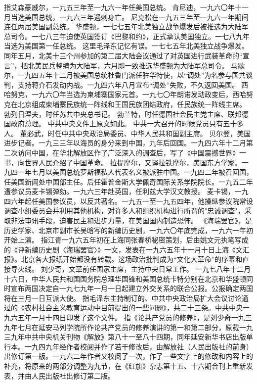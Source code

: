 \begin{maonote}
指艾森豪威尔，一九五三年至一九六一年任美国总统。
肯尼迪，一九六〇年十一月当选美国总统，一九六三年遇刺身亡。
尼克松在一九五三年至一九六一年期间连任两届美国副总统。
华盛顿，一七七五年北美独立战争爆发后被推选为大陆军总司令。一七八三年迫使英国签订《巴黎和约》，正式承认美国独立。一七八九年当选为美国第一任总统。
这里毛泽东记忆有误。一七七五年北美独立战争爆发。同年五月，北美十三个州参加的第二届大陆会议通过了对英国进行武装革命的“宣言”，把北美民兵整编为大陆军，六月即一致推选华盛顿为大陆军总司令。
马歇尔，一九四五年十二月被美国总统杜鲁门派任驻华特使，以“调处”为名参与国共谈判，支持蒋介石发动内战。一九四六年八月宣布“调处”失败，不久返回美国。
西哈努克，一九六〇年当选为柬埔寨国家元首。一九七〇年朗诺发动政变后，西哈努克在北京组成柬埔寨民族统一阵线和王国民族团结政府，任民族统一阵线主席。
勃列日涅夫，时任苏共中央总书记。
勃兰特，时任德国社会民主党主席、联邦德国政府总理。
中共中央文件上原文如此。
中共一大召开的时候党员只有五十多人。
董必武，时任中共中央政治局委员、中华人民共和国副主席。
贝尔登，美国进步记者。一九三三年以海员的身分来到中国，九年后回国。一九四六年十二月第二次访问中国，在华北解放区作了广泛深入的调查后，写了《中国震撼世界》一书，向世界人民介绍了中国革命。
拉提摩尔，又译拉铁摩尔，美国东方学家。一九四一年七月以美国总统罗斯福私人代表名义被派驻中国。一九四二年被召回国，任美国新闻处中国部主任。后任霍普金斯大学佩奇国际关系学院院长。一九五二年遭参议员麦卡锡弹劾。一九六三年赴英国，任利兹大学汉文教授。
麦卡锡，一九四六年起任美国参议员，以反共著名。一九五一至一九五四年，他操纵参议院常设调查小组委员会并利用其他机构，对许多人和组织机构进行所谓的"忠诚调查"，采取非法审讯手段，迫害民主和进步力量，在美国国内制造恐怖。
《海瑞罢官》，是历史学家、北京市副市长吴晗写的新编历史剧，一九六〇年底完成，一九六一年初开始上演。
指江青一九六五年初在上海同张春桥秘密策划，后由姚文元执笔写成的《评新编历史剧〈海瑞罢官〉》一文，发表在一九六五年十一月十日上海《文汇报》。北京各大报纸开始都没有转载。这场政治批判成为“文化大革命”的序幕和直接导火线。
刘少奇，文革前任国家主席，主持中央日常工作。
一九七八年十二月十六日，中华人民共和国国务院总理华国锋和美国总统卡特分别在北京和华盛顿同时宣布两国决定自一九七九年一月一日起建立外交关系的联合公报。公报确定两国将在三月一日互派大使。
指毛泽东主持制订的、中共中央政治局扩大会议讨论通过的《农村社会主义教育运动中目前提出的一些问题》，共二十三条。中共中央一九六五年一月十四日印发了这个文件。
指《论共产党员的修养》，是刘少奇一九三九年七月在延安马列学院所作论共产党员的修养演讲的第一和第二部分，原载一九三九年中共中央机关刊物《解放》第八十一至八十四期，同年延安新华书店出版单行本。一九四九年经作者校阅并作了若干修改后，由解放社（人民出版社的前身）出修订第一版。一九六二年作者又校阅了一次，作了一些文字上的修改和内容上的补充，将原来的两部分调整为九节，在《红旗》杂志第十五、十六期合刊上重新发表，并由人民出版社出修订第二版。

\end{maonote}
